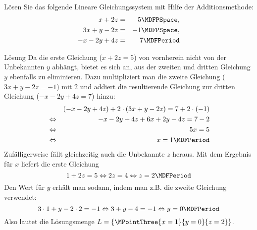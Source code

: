 \begin{MExercises}
\begin{MExercise}
Lösen Sie das folgende Lineare Gleichungssystem mit Hilfe der Additionsmethode:
\begin{eqnarray*}
x + 2 z & = & 5 \MDFPSpace, \\ 3 x + y - 2 z & = & - 1  \MDFPSpace,\\ - x - 2 y + 4 z & = & 7 \MDFPeriod
\end{eqnarray*}

\begin{MHint}{Lösung}
Da die erste Gleichung ($x + 2 z = 5$) von vornherein nicht von der Unbekannten $y$ abhängt, bietet es sich
an, aus der zweiten und dritten Gleichung $y$ ebenfalls zu eliminieren. Dazu multipliziert man die zweite
Gleichung ($3 x + y - 2 z = - 1$) mit $2$ und addiert die resultierende Gleichung zur dritten Gleichung
($- x - 2 y + 4 z = 7$) hinzu:
\begin{eqnarray*}
& & (- x - 2 y + 4 z) + 2 \cdot (3 x + y - 2 z) = 7 + 2 \cdot (- 1) \\
& \Leftrightarrow & - x - 2 y + 4 z + 6 x + 2 y - 4 z = 7 - 2 \\
& \Leftrightarrow & 5 x = 5 \\
& \Leftrightarrow & x = 1 \MDFPeriod
\end{eqnarray*}
Zufälligerweise fällt gleichzeitig auch die Unbekannte $z$ heraus.
Mit dem Ergebnis für $x$ liefert die erste Gleichung
$$1 + 2 z = 5 \Leftrightarrow 2 z = 4 \Leftrightarrow z = 2 \MDFPeriod$$
Den Wert für $y$ erhält man sodann, indem man z.B. die zweite Gleichung verwendet:
$$3 \cdot 1 + y - 2 \cdot 2 = - 1 \Leftrightarrow 3 + y - 4 = - 1 \Leftrightarrow y = 0 \MDFPeriod$$
Also lautet die Lösungsmenge ${\ML} = \{ \MPointThree{x = 1}{y = 0}{z = 2} \}$.
\end{MHint}
\end{MExercise}
\end{MExercises}




